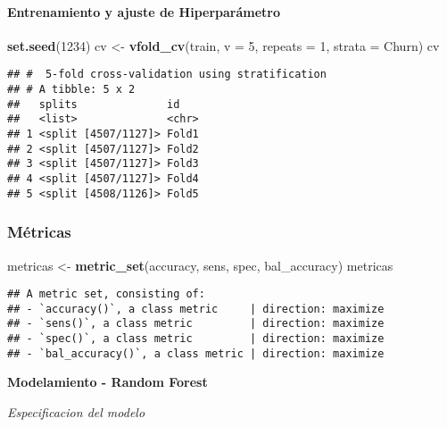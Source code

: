 \documentclass[
]{article}
\newenvironment{Shaded}{\begin{snugshade}}{\end{snugshade}}
\newcommand{\AttributeTok}[1]{\textcolor[rgb]{0.13,0.29,0.53}{#1}}
\newcommand{\DecValTok}[1]{\textcolor[rgb]{0.00,0.00,0.81}{#1}}
\newcommand{\FunctionTok}[1]{\textcolor[rgb]{0.13,0.29,0.53}{\textbf{#1}}}
\newcommand{\NormalTok}[1]{#1}
\newcommand{\OtherTok}[1]{\textcolor[rgb]{0.56,0.35,0.01}{#1}}
\begin{document}
\hypertarget{entrenamiento-y-ajuste-de-hiperparuxe1metro}{%
\paragraph{Entrenamiento y ajuste de
Hiperparámetro}\label{entrenamiento-y-ajuste-de-hiperparuxe1metro}}

\begin{Shaded}
\begin{Highlighting}[]
\FunctionTok{set.seed}\NormalTok{(}\DecValTok{1234}\NormalTok{)}
\NormalTok{cv }\OtherTok{\textless{}{-}} \FunctionTok{vfold\_cv}\NormalTok{(train, }\AttributeTok{v =} \DecValTok{5}\NormalTok{, }\AttributeTok{repeats =} \DecValTok{1}\NormalTok{, }\AttributeTok{strata =}\NormalTok{ Churn)}
\NormalTok{cv}
\end{Highlighting}
\end{Shaded}

\begin{verbatim}
## #  5-fold cross-validation using stratification 
## # A tibble: 5 x 2
##   splits              id   
##   <list>              <chr>
## 1 <split [4507/1127]> Fold1
## 2 <split [4507/1127]> Fold2
## 3 <split [4507/1127]> Fold3
## 4 <split [4507/1127]> Fold4
## 5 <split [4508/1126]> Fold5
\end{verbatim}

\hypertarget{muxe9tricas}{%
\subsubsection{Métricas}\label{muxe9tricas}}

\begin{Shaded}
\begin{Highlighting}[]
\NormalTok{metricas }\OtherTok{\textless{}{-}} \FunctionTok{metric\_set}\NormalTok{(accuracy, sens, spec, bal\_accuracy)}
\NormalTok{metricas}
\end{Highlighting}
\end{Shaded}

\begin{verbatim}
## A metric set, consisting of:
## - `accuracy()`, a class metric     | direction: maximize
## - `sens()`, a class metric         | direction: maximize
## - `spec()`, a class metric         | direction: maximize
## - `bal_accuracy()`, a class metric | direction: maximize
\end{verbatim}

\textbf{Modelamiento - Random Forest}

\emph{Especificacion del modelo}
\end{document}
